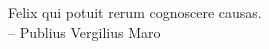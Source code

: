 
\thispagestyle{empty}

\vspace*{3cm}

\begin{center}
    Felix qui potuit rerum cognoscere causas.\\
	\flushright -- Publius Vergilius Maro
\end{center}